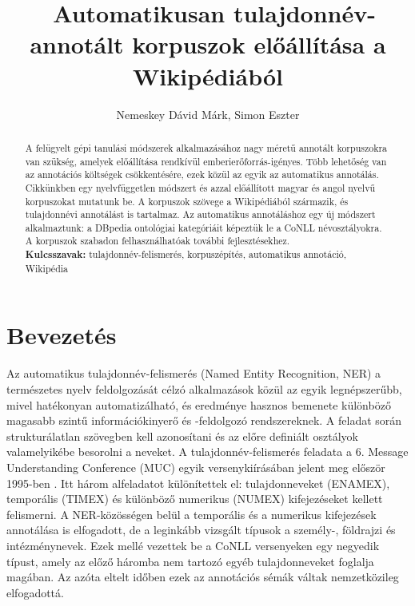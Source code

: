 \documentclass{llncs}
\begin{document}
\pagestyle{myheadings}
\def\leftmark{{\rm IX. Magyar Sz\'am\'\i t\'og\'epes Nyelv\'eszeti Konferencia}}
\def\rightmark{{\rm Szeged, 2013. január 7-8.}}

\setcounter{page}{3}

\title{\ \break Automatikusan tulajdonnév-annotált korpuszok előállítása a Wikipédiából}
\author{Nemeskey Dávid Márk, Simon Eszter}

\maketitle

\begin{abstract}
A felügyelt gépi tanulási módszerek alkalmazásához nagy méretű annotált korpuszokra van szükség, amelyek előállítása rendkívül emberierőforrás-igényes. Több lehetőség van az annotációs költségek csökkentésére, ezek közül az egyik az automatikus annotálás. Cikkünkben egy nyelvfüggetlen módszert és azzal előállított magyar és angol nyelvű korpuszokat mutatunk be. A korpuszok szövege a Wikipédiából származik, és tulajdonnévi annotálást is tartalmaz. Az automatikus annotáláshoz egy új módszert alkalmaztunk: a DBpedia ontológiai kategóriáit képeztük le a CoNLL névosztályokra. A korpuszok szabadon felhasználhatóak további fejlesztésekhez.
\\[2mm]
{\bf Kulcsszavak:} tulajdonnév-felismerés, korpuszépítés,
automatikus annotáció, Wikipédia
\end{abstract}

\section{Bevezet\'es}

Az automatikus tulajdonnév-felismerés (Named Entity Recognition, NER) a természetes nyelv feldolgozását célzó alkalmazások közül az egyik legnépszerűbb, mivel hatékonyan automatizálható, és eredménye hasznos bemenete különböző magasabb szintű információkinyerő és -feldolgozó rendszereknek. A feladat során strukturálatlan szövegben kell azonosítani és az előre definiált osztályok valamelyikébe besorolni a neveket. A tulajdonnév-felismerés feladata a 6. Message Understanding Conference (MUC) egyik versenykiírásában jelent meg először 1995-ben \cite{MUC6}. Itt három alfeladatot különítettek el: tulajdonneveket (ENAMEX), temporális (TIMEX) és különböző numerikus (NUMEX) kifejezéseket kellett felismerni. A NER-közösségen belül a temporális és a numerikus kifejezések annotálása is elfogadott, de a leginkább vizsgált típusok a személy-, földrajzi és intézménynevek. Ezek mellé vezettek be a CoNLL versenyeken \cite{tksintro2002conll} \cite{conll2003intro} egy negyedik típust, amely az előző háromba nem tartozó egyéb tulajdonneveket foglalja magában. Az azóta eltelt időben ezek az annotációs sémák váltak nemzetközileg elfogadottá. 
\end{document}
